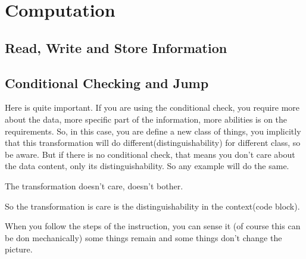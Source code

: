 \section{Computation}
\subsection{Read, Write and Store Information}
\subsection{Conditional Checking and Jump}
Here is quite important. If you are using the conditional check, you require more about the data, more specific part of the information, more abilities is on the requirements. So, in this case, you are define a new class of things, you implicitly that this transformation will do different(distinguishability) for different class, so be aware. But if there is no conditional check, that means you don't care about the data content, only its distinguishability. So any example will do the same.

The transformation doesn't care, doesn't bother.

So the transformation is care is the distinguishability in the context(code block).

When you follow the steps of the instruction, you can sense it (of course this can be don mechanically) some things remain and some things don't change the picture.

